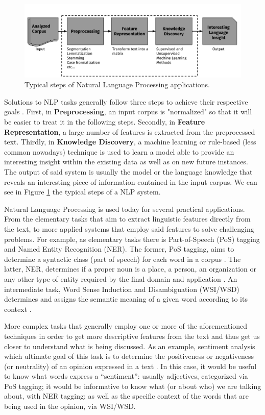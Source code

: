 %
\begin{figure}
\centering
\includegraphics[width=1\linewidth]{./images/Chapitre1/nlp_flow.pdf}
\caption{Typical steps of Natural Language Processing applications.}
\label{fig:nlpflow}
\end{figure}
Solutions to NLP tasks generally follow three steps to achieve their respective goals \cite{mining12Book,JurafskyM09} . First, in \textbf{Preprocessing}, an input corpus is "normalized" so that it will be easier to treat it in the following steps. Secondly, in \textbf{Feature Representation}, a large number of features is extracted from the preprocessed text. Thirdly, in \textbf{Knowledge Discovery},  a machine learning or rule-based (less common nowadays) technique is used to  learn a model able to provide an interesting insight within the existing data as well as on new future instances. The output of said system is usually the model or the language knowledge that reveals an interesting piece of information contained in the input corpus. We can see in Figure \ref{fig:nlpflow}  the typical steps of a NLP system. 

Natural Language Processing is used today for several practical applications. From the elementary tasks that aim to extract linguistic features directly from the text, to more applied systems that employ said features to solve challenging problems. For example, as elementary tasks there is Part-of-Speech (PoS) tagging and Named Entity Recognition (NER). The former, PoS tagging, aims to determine a syntactic class (part of speech) for each word in a corpus \cite{JurafskyM09}. The latter, NER, determines if a proper noun is a place, a person, an organization or any other type of entity required by the final domain and application \cite{nadeau2007survey} . An intermediate task, Word Sense Induction and Disambiguation (WSI/WSD) determines and assigns the semantic meaning of a given word according to its context \cite{ClarkBook2010}.


More complex tasks that generally employ one or more of the aforementioned techniques in order to get more descriptive features from the text and thus get us closer to understand what is being discussed. As an example,  sentiment analysis which ultimate goal of this task is to determine the positiveness or negativeness (or neutrality) of an opinion expressed in a text \cite{liu2012survey}. In this case, it would be useful to know what words express a ``sentiment'': usually adjectives, categorized via PoS tagging; it would be informative to know what (or about who) we are talking about, with NER tagging; as well as the specific context of the words that are being used in the opinion, via WSI/WSD. 



